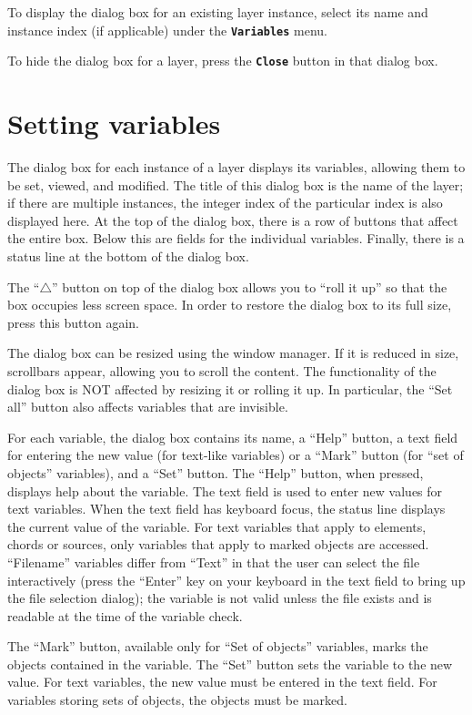 \documentclass[12pt]{report}
\begin{document}
To display the dialog box for an existing layer instance, select its name 
and instance index (if applicable) under 
the \textbf{\texttt{Variables}} menu.

To hide the dialog box for a layer, press the \textbf{\texttt{Close}}
button in that dialog box.

\section{Setting variables}

The dialog box for each instance of a layer displays its variables,
allowing them to be set, viewed, and modified.
The title of this dialog box is the name of the layer; if there are 
multiple instances, the integer index of the particular index
is also displayed here.  At the top of the dialog
box, there is a row of buttons that affect the entire box.
Below this are fields for the individual variables.  Finally, there
is a status line at the bottom of the dialog box.

The ``$\bigtriangleup$'' 
button on top of the dialog box allows you to ``roll it up''
so that the box occupies less screen space. In
order to restore the dialog box to its full size, press this button
again.

The dialog box can be resized using the window manager. If it is
reduced in size, scrollbars appear, allowing you to scroll the
content. The functionality of the dialog box is NOT affected by
resizing it or rolling it up. In particular, the ``Set all'' button also
affects variables that are invisible.

For each variable, the dialog box contains its name, a ``Help'' button, a
text field for entering the new value (for text-like variables) or a 
``Mark''
button (for ``set of objects'' variables), and a ``Set'' button.
The ``Help'' button, when pressed, displays help about the variable.
The text field is used to enter new values for text variables. When
the text field has keyboard focus, the status line displays the
current value of the variable. For text variables that apply to
elements, chords or sources, only variables that apply to marked
objects are accessed.  ``Filename'' variables differ from ``Text''
in that the user can select the file interactively (press the
``Enter'' key on your keyboard in the text field to bring up the
file selection dialog); the variable is not valid unless the file 
exists and is readable at the time of the variable check.

The ``Mark'' button, available only for ``Set of objects'' variables,
marks the objects contained in the variable.
The ``Set'' button sets the variable to the new value. For text
variables, the new value must be entered in the text
field. For variables storing sets of objects, the objects must be
marked.
\end{document}
